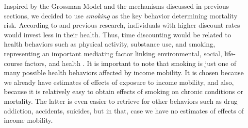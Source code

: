\documentclass[class=article, crop=false, 12pt]{standalone}
\begin{document}
Inspired by the Grossman Model \citep{grossman1972} and the mechanisms discussed in previous sections, we decided to use \emph{smoking} as the key behavior determining mortality risk. According to \citet{grossman1972} and previous research, individuals with higher discount rates would invest less in their health. Thus, time discounting would be related to health behaviors such as physical activity, substance use, and smoking, representing an important mediating factor linking environmental, social, life-course factors, and health \citep{barlow2016, story2014}.
It is important to note that smoking is just one of many possible health behaviors affected by income mobility. It is chosen because we already have estimates of effects of exposure to income mobility, and also, because it is relatively easy to obtain effects of smoking on chronic conditions or mortality. The latter is even easier to retrieve for other behaviors such as drug addiction, accidents, suicides, but in that, case we have no estimates of effects of income mobility. 
\end{document}
